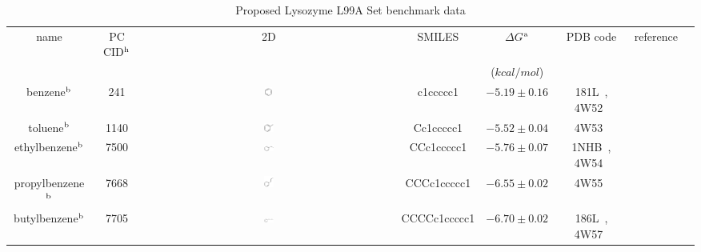 \documentclass[aps,pre,twocolumn,nofootinbib,superscriptaddress,10pt, final,tightenlines]{revtex4-1}
\begin{document}
\begingroup
\squeezetable
\begin{table}
\caption{Proposed Lysozyme L99A Set benchmark data}
\label{apolar_benchmark}
\begin{center}
\begin{tabular}{@{}| c | c | c | c | c | c | c | c@{}}
\hline
name & PC CID$^{\rm h}$ & 2D &  SMILES & $\Delta G$$^{\rm a}$ & PDB code & reference\\\
           &     &        &    & ($kcal/mol$) &                  &                 \\\hline

benzene$^{\rm b}$ &  241 &  \includegraphics[width=0.03\textwidth]{figures/241.pdf} & c1ccccc1 & $-5.19\pm0.16$  &  181L~\cite{morton_specificity_1995}, 4W52~\cite{merski_homologous_2015}  &   \cite{morton_energetic_1995}\\   %
toluene$^{\rm b}$  &  1140  & \includegraphics[width=0.04\textwidth]{figures/1140.pdf} & Cc1ccccc1 & $-5.52\pm0.04$ &   4W53~\cite{merski_homologous_2015}                                                              &  \cite{morton_energetic_1995}\\   %
ethylbenzene$^{\rm b}$ & 7500 &  \includegraphics[width=0.04\textwidth]{figures/7500.pdf} & CCc1ccccc1 & $-5.76\pm0.07$  &   1NHB~\cite{morton_specificity_1995}, 4W54~\cite{merski_homologous_2015} & \cite{morton_energetic_1995} \\ %
propylbenzene$^{\rm b}$ & 7668 & \includegraphics[width=0.04\textwidth]{figures/7668.pdf} & CCCc1ccccc1 & $-6.55\pm0.02$  &  4W55~\cite{merski_homologous_2015}  &  \cite{morton_energetic_1995} \\ %
butylbenzene$^{\rm b}$ &  7705 & \includegraphics[width=0.04\textwidth]{figures/7705.pdf} & CCCCc1ccccc1 &  $-6.70\pm0.02$ &  186L~\cite{morton_specificity_1995}, 4W57~\cite{merski_homologous_2015}  &   \cite{morton_energetic_1995} \\%

\end{tabular}
\end{center}
\end{table}
\end{document}
